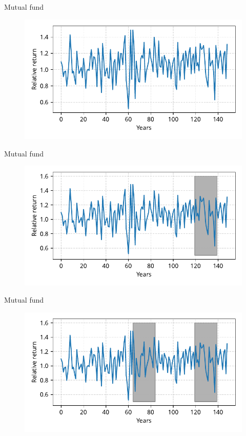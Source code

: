 \documentclass[12pt, aspectratio=149]{beamer}
\theoremstyle{plain}
\begin{document}
\begin{frame}[fragile]{Mutual fund}
 \begin{figure}
    	\centering
    	\includegraphics[width=0.99\linewidth]{figures/stock_returns}
 \end{figure}
\end{frame}

\begin{frame}[fragile]{Mutual fund}
 \begin{figure}
    	\centering
    	\includegraphics[width=0.99\linewidth]{figures/stock_returns_0}
 \end{figure}
\end{frame}

\begin{frame}[fragile]{Mutual fund}
 \begin{figure}
    	\centering
    	\includegraphics[width=0.99\linewidth]{figures/stock_returns_1}
 \end{figure}
\end{frame}
\end{document}
